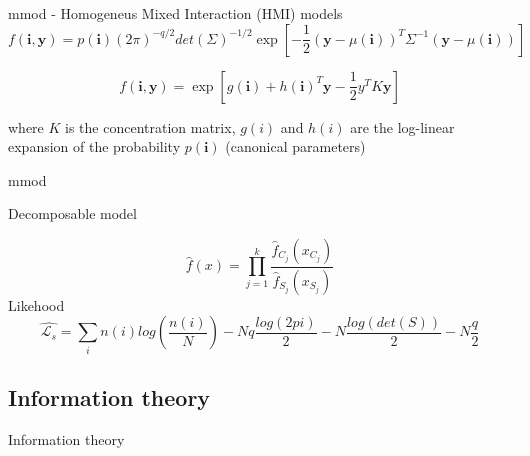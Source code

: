 \documentclass{beamer}
\begin{document}
\begin{frame}{mmod - Homogeneus Mixed Interaction (HMI) models}
\begin{equation}
f(\textbf{i},\textbf{y})= p(\textbf{i})(2\pi)^{-q/2}det(\Sigma)^{-1/2}\exp\left[-\dfrac{1}{2}\left(\textbf{y}-\mu(\textbf{i})\right)^{T}\Sigma^{-1}\left(\textbf{y}-\mu(\textbf{i})\right)\right]
\label{gaussMix}
\end{equation}

\begin{equation}
f(\textbf{i},\textbf{y})=\exp\left[g(\textbf{i}) +h(\textbf{i})^{T}\textbf{y}-\frac{1}{2}y^{T}K\textbf{y}\right]
\end{equation}

\begin{center}
where $K$ is the concentration matrix, $g(i)$ and $h(i)$ are the log-linear expansion of the probability $p(\textbf{i})$ (canonical parameters)
\end{center}

\end{frame}
\begin{frame}{mmod}
\begin{center}
Decomposable model
\end{center}
\begin{equation}
\hat{f}(x)=\prod_{j=1}^{k}\dfrac{\hat{f}_{C_{j}}(x_{C}_{j})}{\hat{f}_{S_{j}}(x_{S}_{j})} 
\end{equation}
Likehood 
\begin{equation}
\hat{\mathcal{L}_{s}}=\sum_{i}n(i)log\left(\dfrac{n(i)}{N}\right)-Nq\dfrac{log(2pi)}{2}-N\dfrac{log(det(S))}{2}-N\frac{q}{2}
\end{equation}

\end{frame}


\subsection{Information theory}
\begin{frame}{}
\begin{center}
{\Huge Information theory}
\end{center}
\end{frame}
\end{document}

